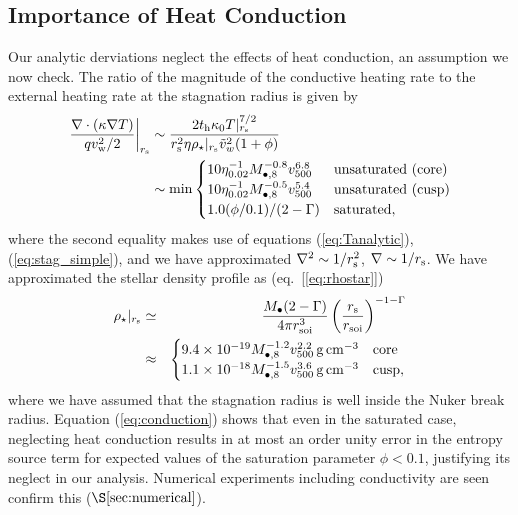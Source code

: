 \documentclass[usenatbib,fleqn]{mn2e}
\begin{document}
\subsection{Importance of Heat Conduction}
\label{sec:conductivity}

Our analytic derviations neglect the effects of heat conduction, an assumption we now check.  The ratio of the magnitude of the conductive heating rate to the external heating rate at the stagnation radius is given by
\begin{align}
  \left.\frac{\nabla\cdot(\kappa \nabla T)}{q v_{\rm
w}^{2}/2}\right|_{r_{\rm s}} &\sim \frac{2t_{\rm h}\kappa_0
T|_{r_{\rm s}}^{7/2}}{r_{\rm s}^{2}\eta \rho_{\star}|_{r_{\rm s}} \tilde{v}_{w}^{2}(1+\phi)}
\nonumber \\ &\sim {\rm min}
  \begin{cases}
  10 \eta_{0.02}^{-1}
M_{\bullet,8}^{-0.8} v_{500}^{6.8} &  \text{unsaturated (core)}\\
 10 \eta_{0.02}^{-1}
M_{\bullet,8}^{-0.5} v_{500}^{5.4} &  \text{unsaturated (cusp)}\\
  1.0(\phi/0.1)/(2-\Gamma) & \text{saturated},
  \end{cases}
 \label{eq:conduction}
\end{align}
where the second equality makes use of equations (\ref{eq:Tanalytic}), (\ref{eq:stag_simple}), and we have approximated $\nabla^{2} \sim 1/r_{\rm s}^{2}$, $\nabla \sim 1/r_{\rm s}$.  We have approximated the stellar density profile as (eq.~[\ref{eq:rhostar}])
\begin{eqnarray}
  \rho_{\star}|_{r_{\rm s}} &\simeq& \frac{M_{\bullet}(2-\Gamma)}{4\pi r_{\rm soi}^{3}}\left(\frac{r_{\rm s}}{r_{\rm soi}}\right)^{-1-\Gamma} \nonumber \\
 &\approx& \begin{cases}
    9.4 \times 10^{-19}M_{\bullet,8}^{-1.2}v_{500}^{2.2}\,{\rm g\,cm^{-3}}
    & \text{core} \\
    1.1 \times 10^{-18} M_{\bullet,8}^{-1.5}v_{500}^{3.6}
    \,{\rm g\,cm^{-3}}  & \text{cusp}, 
  \end{cases}
  \label{eq:rhostarrs}
\end{eqnarray}
where we have assumed that the stagnation radius is well inside the Nuker break radius.  Equation (\ref{eq:conduction}) shows that even in the saturated case, neglecting heat conduction results in at most an order unity error in the entropy source term for expected values of the saturation parameter $\phi < 0.1$, justifying its neglect in our analysis.  Numerical experiments including conductivity are seen confirm this ($\S\ref{sec:numerical}$). 
\end{document}
